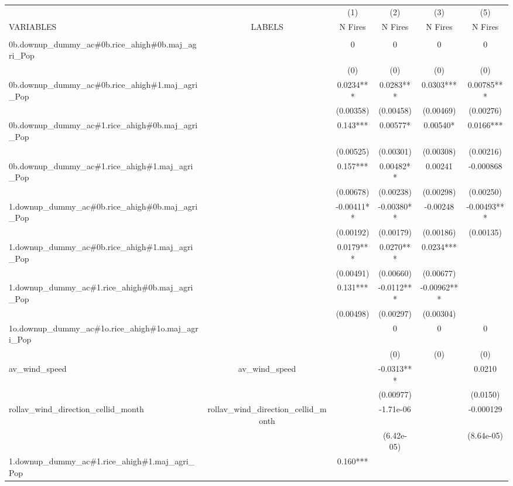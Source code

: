 \documentclass[]{article}
\begin{document}
\begin{tabular}{lccccc} \hline
 &  & (1) & (2) & (3) & (5) \\
VARIABLES & LABELS & N Fires & N Fires & N Fires & N Fires \\ \hline
 &  &  &  &  &  \\
0b.downup\_dummy\_ac\#0b.rice\_ahigh\#0b.maj\_agri\_Pop &  & 0 & 0 & 0 & 0 \\
 &  & (0) & (0) & (0) & (0) \\
0b.downup\_dummy\_ac\#0b.rice\_ahigh\#1.maj\_agri\_Pop &  & 0.0234*** & 0.0283*** & 0.0303*** & 0.00785*** \\
 &  & (0.00358) & (0.00458) & (0.00469) & (0.00276) \\
0b.downup\_dummy\_ac\#1.rice\_ahigh\#0b.maj\_agri\_Pop &  & 0.143*** & 0.00577* & 0.00540* & 0.0166*** \\
 &  & (0.00525) & (0.00301) & (0.00308) & (0.00216) \\
0b.downup\_dummy\_ac\#1.rice\_ahigh\#1.maj\_agri\_Pop &  & 0.157*** & 0.00482** & 0.00241 & -0.000868 \\
 &  & (0.00678) & (0.00238) & (0.00298) & (0.00250) \\
1.downup\_dummy\_ac\#0b.rice\_ahigh\#0b.maj\_agri\_Pop &  & -0.00411** & -0.00380** & -0.00248 & -0.00493*** \\
 &  & (0.00192) & (0.00179) & (0.00186) & (0.00135) \\
1.downup\_dummy\_ac\#0b.rice\_ahigh\#1.maj\_agri\_Pop &  & 0.0179*** & 0.0270*** & 0.0234*** &  \\
 &  & (0.00491) & (0.00660) & (0.00677) &  \\
1.downup\_dummy\_ac\#1.rice\_ahigh\#0b.maj\_agri\_Pop &  & 0.131*** & -0.0112*** & -0.00962*** &  \\
 &  & (0.00498) & (0.00297) & (0.00304) &  \\
1o.downup\_dummy\_ac\#1o.rice\_ahigh\#1o.maj\_agri\_Pop &  &  & 0 & 0 & 0 \\
 &  &  & (0) & (0) & (0) \\
av\_wind\_speed & av\_wind\_speed &  & -0.0313*** &  & 0.0210 \\
 &  &  & (0.00977) &  & (0.0150) \\
rollav\_wind\_direction\_cellid\_month & rollav\_wind\_direction\_cellid\_month &  & -1.71e-06 &  & -0.000129 \\
 &  &  & (6.42e-05) &  & (8.64e-05) \\
1.downup\_dummy\_ac\#1.rice\_ahigh\#1.maj\_agri\_Pop &  & 0.160*** &  &  &  \\

\end{tabular}
\end{document}
